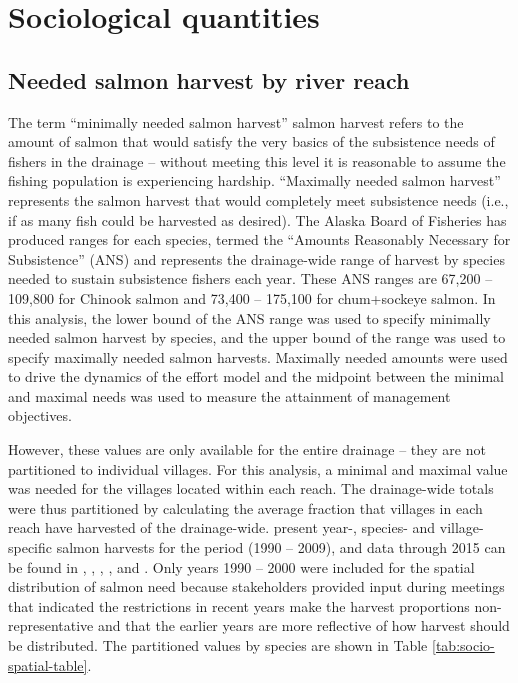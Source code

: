 \documentclass[12pt,]{book}
\theoremstyle{definition}
\theoremstyle{definition}
\theoremstyle{definition}
\theoremstyle{remark}
\begin{document}
\section{Sociological quantities}\label{sociological-quantities}

\subsection{Needed salmon harvest by river reach}\label{mse-data-needs}

\noindent
The term ``minimally needed salmon harvest'' salmon harvest refers to
the amount of salmon that would satisfy the very basics of the
subsistence needs of fishers in the drainage -- without meeting this
level it is reasonable to assume the fishing population is experiencing
hardship. ``Maximally needed salmon harvest'' represents the salmon
harvest that would completely meet subsistence needs (i.e., if as many
fish could be harvested as desired). The Alaska Board of Fisheries has
produced ranges for each species, termed the ``Amounts Reasonably
Necessary for Subsistence'' (ANS) and represents the drainage-wide range
of harvest by species needed to sustain subsistence fishers each year.
These ANS ranges are 67,200 -- 109,800 for Chinook salmon and 73,400 --
175,100 for chum+sockeye salmon. In this analysis, the lower bound of
the ANS range was used to specify minimally needed salmon harvest by
species, and the upper bound of the range was used to specify maximally
needed salmon harvests. Maximally needed amounts were used to drive the
dynamics of the effort model and the midpoint between the minimal and
maximal needs was used to measure the attainment of management
objectives.

However, these values are only available for the entire drainage -- they
are not partitioned to individual villages. For this analysis, a minimal
and maximal value was needed for the villages located within each reach.
The drainage-wide totals were thus partitioned by calculating the
average fraction that villages in each reach have harvested of the
drainage-wide. \citet{hamazaki-2011} present year-, species- and
village-specific salmon harvests for the period (1990 -- 2009), and data
through 2015 can be found in \citet{carroll-hamazaki-2012},
\citet{shelden-etal-2014}, \citet{shelden-etal-2015},
\citet{shelden-etal-2016a}, and \citet{shelden-etal-2016b}. Only years
1990 -- 2000 were included for the spatial distribution of salmon need
because stakeholders provided input during meetings that indicated the
restrictions in recent years make the harvest proportions
non-representative and that the earlier years are more reflective of how
harvest should be distributed. The partitioned values by species are
shown in Table \ref{tab:socio-spatial-table}.
\end{document}
